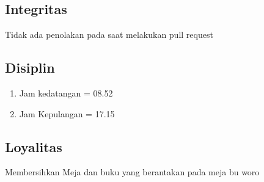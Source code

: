 \subsection{Integritas}
Tidak ada penolakan pada saat melakukan pull request
\subsection{Disiplin}
\begin{enumerate}
\item Jam kedatangan = 08.52
\item Jam Kepulangan = 17.15
\end{enumerate}
\subsection{Loyalitas}
 Membersihkan Meja dan buku yang berantakan pada meja bu woro